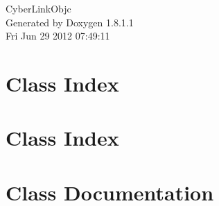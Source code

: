 \documentclass{book}
\begin{document}
\hypersetup{pageanchor=false,citecolor=blue}
\begin{titlepage}
\vspace*{7cm}
\begin{center}
{\Large Cyber\-Link\-Objc }\\
\vspace*{1cm}
{\large Generated by Doxygen 1.8.1.1}\\
\vspace*{0.5cm}
{\small Fri Jun 29 2012 07:49:11}\\
\end{center}
\end{titlepage}
\clearemptydoublepage
{}
\tableofcontents
\clearemptydoublepage
{}
\hypersetup{pageanchor=true,citecolor=blue}
\chapter{Class Index}

\chapter{Class Index}

\chapter{Class Documentation}
















\printindex
\end{document}
